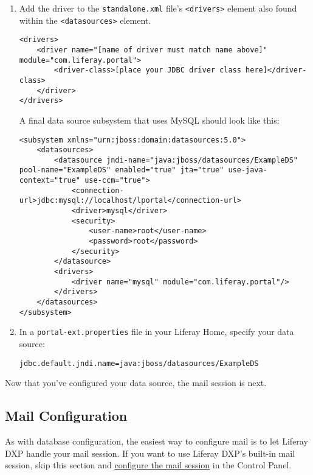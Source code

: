 \begin{enumerate}
\def\labelenumi{\arabic{enumi}.}
\setcounter{enumi}{1}
\item
  Add the driver to the \texttt{standalone.xml} file's
  \texttt{\textless{}drivers\textgreater{}} element also found within
  the \texttt{\textless{}datasources\textgreater{}} element.

\begin{verbatim}
<drivers>
    <driver name="[name of driver must match name above]" module="com.liferay.portal">
        <driver-class>[place your JDBC driver class here]</driver-class>
    </driver>
</drivers>
\end{verbatim}

  A final data source subsystem that uses MySQL should look like this:

\begin{verbatim}
<subsystem xmlns="urn:jboss:domain:datasources:5.0">
    <datasources>
        <datasource jndi-name="java:jboss/datasources/ExampleDS" pool-name="ExampleDS" enabled="true" jta="true" use-java-context="true" use-ccm="true">
            <connection-url>jdbc:mysql://localhost/lportal</connection-url>
            <driver>mysql</driver>
            <security>
                <user-name>root</user-name>
                <password>root</password>
            </security>
        </datasource>
        <drivers>
            <driver name="mysql" module="com.liferay.portal"/>
        </drivers>
    </datasources>
</subsystem>
\end{verbatim}
\item
  In a \texttt{portal-ext.properties} file in your Liferay Home, specify
  your data source:

\begin{verbatim}
jdbc.default.jndi.name=java:jboss/datasources/ExampleDS
\end{verbatim}
\end{enumerate}

Now that you've configured your data source, the mail session is next.

\subsection{Mail Configuration}\label{mail-configuration-2}

As with database configuration, the easiest way to configure mail is to
let Liferay DXP handle your mail session. If you want to use Liferay
DXP's built-in mail session, skip this section and
\href{/docs/7-1/deploy/-/knowledge_base/d/installing-liferay\#configuring-mail}{configure
the mail session} in the Control Panel.

